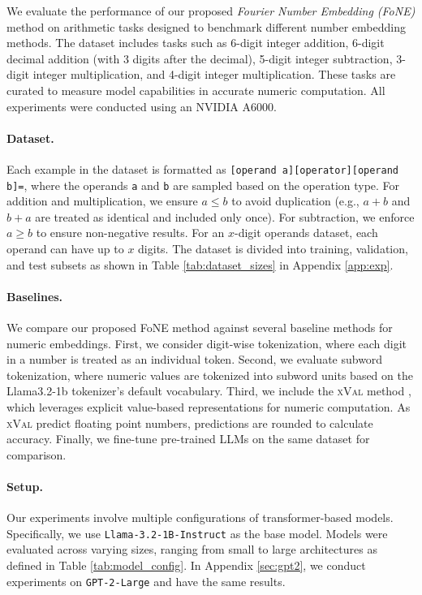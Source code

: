 We evaluate the performance of our proposed \textit{Fourier Number Embedding (FoNE)} method on arithmetic tasks designed to benchmark different number embedding methods. The dataset includes tasks such as 6-digit integer addition, 6-digit decimal addition (with 3 digits after the decimal), 5-digit integer subtraction, 3-digit integer multiplication, and 4-digit integer multiplication. These tasks are curated to measure model capabilities in accurate numeric computation. All experiments were conducted using an NVIDIA A6000.

\paragraph{Dataset.}
Each example in the dataset is formatted as \texttt{[operand a][operator][operand b]=}, where the operands \texttt{a} and \texttt{b} are sampled based on the operation type. For addition and multiplication, we ensure \(a \leq b\) to avoid duplication (e.g., \(a + b\) and \(b + a\) are treated as identical and included only once). For subtraction, we enforce \(a \geq b\) to ensure non-negative results. 
For an \(x\)-digit operands dataset, each operand can have up to \(x\) digits. The dataset is divided into training, validation, and test subsets as shown in Table \ref{tab:dataset_sizes} in Appendix \ref{app:exp}.


\paragraph{Baselines.} We compare our proposed FoNE method against several baseline methods for numeric embeddings. First, we consider digit-wise tokenization, where each digit in a number is treated as an individual token. Second, we evaluate subword tokenization, where numeric values are tokenized into subword units based on the Llama3.2-1b tokenizer's default vocabulary. Third, we include the \textsc{xVal} method \cite{golkar2023xval}, which leverages explicit value-based representations for numeric computation. As \textsc{xVal} predict floating point numbers, predictions are rounded to calculate accuracy. Finally, we fine-tune pre-trained LLMs on the same dataset for comparison.

\paragraph{Setup.} Our experiments involve multiple configurations of transformer-based models. Specifically, we use \texttt{Llama-3.2-1B-Instruct} as the base model. Models were evaluated across varying sizes, ranging from small to large architectures as defined in Table \ref{tab:model_config}. In Appendix \ref{sec:gpt2}, we conduct experiments on \texttt{GPT-2-Large} and have the same results.

